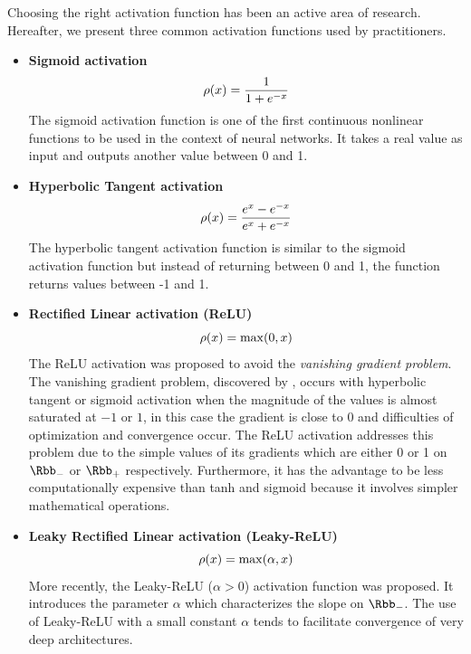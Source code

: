 Choosing the right activation function has been an active area of research.
Hereafter, we present three common activation functions used by practitioners.
\begin{itemize}
  \item \textbf{Sigmoid activation} \cite{han1995influence}
    \begin{equation*}
      \rho(x) = \frac{1}{1+e^{-x}} 
    \end{equation*}
    The sigmoid activation function is one of the first continuous nonlinear functions to be used in the context of neural networks.
		It takes a real value as input and outputs another value between 0 and 1.
  \item \textbf{Hyperbolic Tangent activation} \cite{karlik2011performance}
    \begin{equation*}
      \rho(x) = \frac{e^x - e^{-x}}{e^x + e^{-x}}
    \end{equation*}
    The hyperbolic tangent activation function is similar to the sigmoid activation function but instead of returning between 0 and 1, the function returns values between -1 and 1.
  \item \textbf{Rectified Linear activation (ReLU)} \cite{nair2010rectified,maas2013rectifier}
    \begin{equation*}
      \rho(x) = \max(0, x)
    \end{equation*}
    The ReLU activation was proposed to avoid the \emph{vanishing gradient problem}.
    The vanishing gradient problem, discovered by \citet{bengio1994learning}, occurs with hyperbolic tangent or sigmoid activation when the magnitude of the values is almost saturated at $-1$ or $1$, in this case the gradient is close to $0$ and difficulties of optimization and convergence occur.
    The ReLU activation addresses this problem due to the simple values of its gradients which are either 0 or 1 on $\Rbb_-$ or $\Rbb_+$ respectively.
    Furthermore, it has the advantage to be less computationally expensive than tanh and sigmoid because it involves simpler mathematical operations.
  \item \textbf{Leaky Rectified Linear activation (Leaky-ReLU)} \cite{maas2013rectifier}
    \begin{equation*}
      \rho(x) = \max(\alpha, x)
    \end{equation*}
    More recently, the Leaky-ReLU ($\alpha > 0$) activation function was proposed.
    It introduces the parameter $\alpha$ which characterizes the slope on $\Rbb_-$.
    The use of Leaky-ReLU with a small constant $\alpha$ tends to facilitate convergence of very deep architectures.
\end{itemize}

